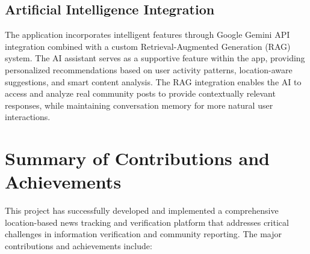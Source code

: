 \subsection{Artificial Intelligence Integration}
\label{sec:intro_ai_integration}

The application incorporates intelligent features through Google Gemini API integration combined with a custom Retrieval-Augmented Generation (RAG) system. The AI assistant serves as a supportive feature within the app, providing personalized recommendations based on user activity patterns, location-aware suggestions, and smart content analysis. The RAG integration enables the AI to access and analyze real community posts to provide contextually relevant responses, while maintaining conversation memory for more natural user interactions.

\section{Summary of Contributions and Achievements}
\label{sec:intro_sum_results}

This project has successfully developed and implemented a comprehensive location-based news tracking and verification platform that addresses critical challenges in information verification and community reporting. The major contributions and achievements include:

